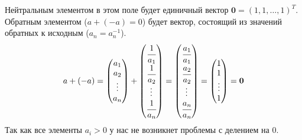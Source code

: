 \documentclass[a4paper, 12pt]{article}
\begin{document}
Нейтральным элементом в этом поле будет единичный вектор $\mathbf{0} = (1, 1, \dots, 1)^T$. Обратным элементом ($a + (-a) = 0$) будет вектор, состоящий из значений обратных к исходным ($a_n = a_n^{-1}$).
\[
a + (-a) = 
\begin{pmatrix}
    a_1 \\ 
    a_2 \\  
    \vdots \\
    a_n
\end{pmatrix} +
\begin{pmatrix}
    \cfrac{1}{a_1} \\ 
    \cfrac{1}{a_2} \\  
    \vdots \\
    \cfrac{1}{a_n}
\end{pmatrix} = 
\begin{pmatrix}
    \cfrac{a_1}{a_1} \\ 
    \cfrac{a_2}{a_2} \\  
    \vdots \\
    \cfrac{a_n}{a_n}
\end{pmatrix} = 
\begin{pmatrix}
    1 \\ 
    1 \\  
    \vdots \\
    1
\end{pmatrix} = \mathbf{0}
\]
Так как все элементы $a_i > 0$ у нас не возникнет проблемы с делением на $0$. \\ 
\end{document}
